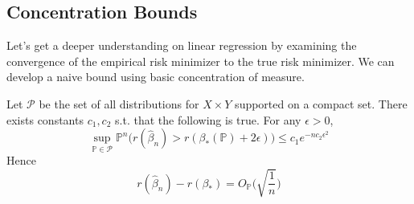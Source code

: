 \subsection{Concentration Bounds} 

  Let's get a deeper understanding on linear regression by examining the convergence of the empirical risk minimizer to the true risk minimizer. We can develop a naive bound using basic concentration of measure. 

  \begin{theorem}
    \label{thm:exponential-bound}
    Let $\mathcal{P}$ be the set of all distributions for $X \times Y$ supported on a compact set. There exists constants $c_1, c_2$ s.t. that the following is true. For any $\epsilon > 0$, 
    \begin{equation}
      \sup_{\mathbb{P} \in \mathcal{P}} \mathbb{P}^n \big( r(\hat{\beta}_n) > r (\beta_\ast (\mathbb{P}) + 2 \epsilon )\big) \leq c_1 e^{-n c_2 \epsilon^2}
    \end{equation}
    Hence 
    \begin{equation}
      r(\hat{\beta}_n ) - r(\beta_\ast) = O_{\mathbb{P}} \bigg( \sqrt{\frac{1}{n}} \bigg)
    \end{equation}
  \end{theorem} 
